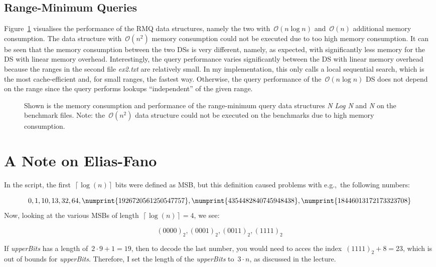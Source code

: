 \documentclass[a4paper,UKenglish,cleveref, autoref, thm-restate]{lipics-v2021}
\newcommand{\eg}{e.g.,\xspace~}
\begin{document}
	\subsection{Range-Minimum Queries}
	Figure~\ref{fig:rmq} visualises the performance of the RMQ data structures, namely the two with~$\mathcal{O}\left(n \log n\right)$ and~$\mathcal{O}\left(n\right)$ additional memory consumption. The data structure with~$\mathcal{O}\left(n^2\right)$ memory consumption could not be executed due to too high memory consumption. It can be seen that the memory consumption between the two DSs is very different, namely, as expected, with significantly less memory for the DS with linear memory overhead. Interestingly, the query performance varies significantly between the DS with linear memory overhead because the ranges in the second file \textit{ex2.txt} are relatively small. In my implementation, this only calls a local sequential search, which is the most cache-efficient and, for small ranges, the fastest way. Otherwise, the query performance of the~$\mathcal{O}\left(n \log n\right)$ DS does not depend on the range since the query performs lookups ``independent'' of the given range.
	\begin{figure}[htbp]
		\begin{center}
			\resizebox{.9\linewidth}{!}{
				
			}
			\caption{Shown is the memory consumption and performance of the range-minimum query data structures \textit{N Log N} and \textit{N} on the benchmark files. Note: the~$\mathcal{O}\left(n^2\right)$ data structure could not be executed on the benchmarks due to high memory consumption.}
			\label{fig:rmq}
		\end{center}
	\end{figure}
	
	
	
	\appendix
	\section{A Note on Elias-Fano}
	\label{app:sec::ef}
	In the script, the first~$\left\lceil \log\left(n\right)\right\rceil$ bits were defined as MSB, but this definition caused problems with \eg the following numbers:
	
	\begin{equation*}
		0, 1, 10, 13, 32, 64, \numprint{1926720561250547757}, \numprint{4354482840745948438}, \numprint{18446013172173323708}
	\end{equation*}
	Now, looking at the various MSBs of length~$\left\lceil \log\left(n\right)\right\rceil = 4$, we see:
	
	\begin{equation}
		\left(0000\right)_2, \left(0001\right)_2, \left(0011\right)_2, \left(1111\right)_2
	\end{equation}
	
	If \textit{upperBits} has a length of~$2\cdot9+1 = 19$, then to decode the last number, you would need to acces the index~$\left(1111\right)_2 + 8 = 23$, which is out of bounds for \textit{upperBits}. Therefore, I set the length of the \textit{upperBits} to~$3 \cdot n$, as discussed in the lecture.
\end{document}
